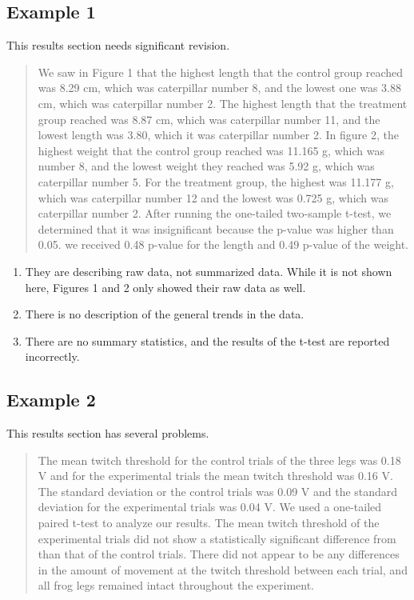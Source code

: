 \documentclass[
]{book}
\providecommand{\tightlist}{%
  \setlength{\itemsep}{0pt}\setlength{\parskip}{0pt}}
\begin{document}
\hypertarget{example-1-6}{%
\subsection{Example 1}\label{example-1-6}}

This results section needs significant revision.

\begin{quote}
We saw in Figure 1 that the highest length that the control group reached was 8.29 cm, which was caterpillar number 8, and the lowest one was 3.88 cm, which was caterpillar number 2. The highest length that the treatment group reached was 8.87 cm, which was caterpillar number 11, and the lowest length was 3.80, which it was caterpillar number 2. In figure 2, the highest weight that the control group reached was 11.165 g, which was number 8, and the lowest weight they reached was 5.92 g, which was caterpillar number 5. For the treatment group, the highest was 11.177 g, which was caterpillar number 12 and the lowest was 0.725 g, which was caterpillar number 2. After running the one-tailed two-sample t-test, we determined that it was insignificant because the p-value was higher than 0.05. we received 0.48 p-value for the length and 0.49 p-value of the weight.
\end{quote}

\begin{enumerate}
\def\labelenumi{\arabic{enumi}.}
\tightlist
\item
  They are describing raw data, not summarized data. While it is not shown here, Figures 1 and 2 only showed their raw data as well.
\item
  There is no description of the general trends in the data.
\item
  There are no summary statistics, and the results of the t-test are reported incorrectly.
\end{enumerate}

\hypertarget{example-2-6}{%
\subsection{Example 2}\label{example-2-6}}

This results section has several problems.

\begin{quote}
The mean twitch threshold for the control trials of the three legs was 0.18 V and for the experimental trials the mean twitch threshold was 0.16 V. The standard deviation or the control trials was 0.09 V and the standard deviation for the experimental trials was 0.04 V. We used a one-tailed paired t-test to analyze our results. The mean twitch threshold of the experimental trials did not show a statistically significant difference from than that of the control trials. There did not appear to be any differences in the amount of movement at the twitch threshold between each trial, and all frog legs remained intact throughout the experiment.
\end{quote}
\end{document}
